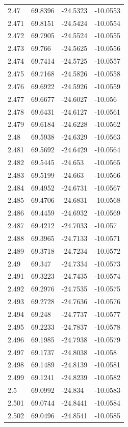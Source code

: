 \begin{tabular}{llll}
2.47 & 69.8396 & -24.5323 & -10.0553 \\
2.471 & 69.8151 & -24.5424 & -10.0554 \\
2.472 & 69.7905 & -24.5524 & -10.0555 \\
2.473 & 69.766 & -24.5625 & -10.0556 \\
2.474 & 69.7414 & -24.5725 & -10.0557 \\
2.475 & 69.7168 & -24.5826 & -10.0558 \\
2.476 & 69.6922 & -24.5926 & -10.0559 \\
2.477 & 69.6677 & -24.6027 & -10.056 \\
2.478 & 69.6431 & -24.6127 & -10.0561 \\
2.479 & 69.6184 & -24.6228 & -10.0562 \\
2.48 & 69.5938 & -24.6329 & -10.0563 \\
2.481 & 69.5692 & -24.6429 & -10.0564 \\
2.482 & 69.5445 & -24.653 & -10.0565 \\
2.483 & 69.5199 & -24.663 & -10.0566 \\
2.484 & 69.4952 & -24.6731 & -10.0567 \\
2.485 & 69.4706 & -24.6831 & -10.0568 \\
2.486 & 69.4459 & -24.6932 & -10.0569 \\
2.487 & 69.4212 & -24.7033 & -10.057 \\
2.488 & 69.3965 & -24.7133 & -10.0571 \\
2.489 & 69.3718 & -24.7234 & -10.0572 \\
2.49 & 69.347 & -24.7334 & -10.0573 \\
2.491 & 69.3223 & -24.7435 & -10.0574 \\
2.492 & 69.2976 & -24.7535 & -10.0575 \\
2.493 & 69.2728 & -24.7636 & -10.0576 \\
2.494 & 69.248 & -24.7737 & -10.0577 \\
2.495 & 69.2233 & -24.7837 & -10.0578 \\
2.496 & 69.1985 & -24.7938 & -10.0579 \\
2.497 & 69.1737 & -24.8038 & -10.058 \\
2.498 & 69.1489 & -24.8139 & -10.0581 \\
2.499 & 69.1241 & -24.8239 & -10.0582 \\
2.5 & 69.0992 & -24.834 & -10.0583 \\
2.501 & 69.0744 & -24.8441 & -10.0584 \\
2.502 & 69.0496 & -24.8541 & -10.0585 \\

\end{tabular}
